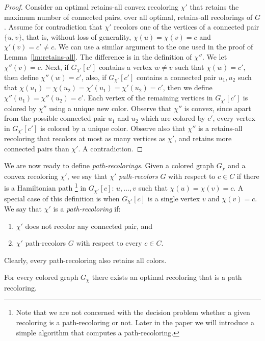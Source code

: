 \begin{proof}
Consider an optimal retains-all convex recoloring $\chi'$ 
that retains the maximum number of connected pairs, 
over all optimal, 
retains-all recolorings of $G$.  
%
Assume for contradiction that $\chi'$ 
recolors one of the vertices of a connected pair $\{u, v\}$, 
that is, 
without loss of generality,
$\chi(u) = \chi(v) = c$ and $\chi'(v) = c' \neq c$.
%
We can use a similar argument to the one used in the proof of Lemma~\ref{lm:retains-all}.
%
The difference is in the definition of $\chi''$.  
%
We let $\chi''(v) = c$. 
Next, if $G_{\chi'}[c']$ contains a vertex $w \neq v$ such that $\chi(w) = c'$,
then define $\chi''(w) = c'$, 
also, if $G_{\chi'}[c']$ contains a connected pair $u_1, u_2$ 
such that $\chi(u_1) = \chi(u_2) = \chi'(u_1) = \chi'(u_2) = c'$, 
then we define $\chi''(u_1) = \chi''(u_2) = c'$.
Each vertex of the remaining vertices in $G_{\chi'}[c']$ is colored by $\chi''$ 
using a unique new color.
%
Observe that $\chi''$ is convex, since apart from the possible
connected pair $u_1$ and $u_2$ which are colored by $c'$, every vertex
in $G_{\chi'}[c']$ is colored by a unique color.
%
Observe also that $\chi''$ is a retains-all recoloring that recolors at most as
many vertices as $\chi'$, and retains more connected pairs than $\chi'$. 
%
A contradiction.
{}\end{proof}

We are now ready to define \emph{path-recolorings}.
%
Given a colored graph $G_\chi$ and a convex recoloring $\chi'$, 
we say that $\chi'$ \emph{path-recolors} $G$ with respect to $c \in C$ 
if there is a Hamiltonian path 
\footnote{
Note that we are not concerned with the decision problem whether a given recoloring 
is a path-recoloring or not.
Later in the paper we will introduce a simple algorithm that computes a path-recoloring. 
} 
in $G_{\chi'}[c]$: 
$u, \dots, v$ such that $\chi(u) = \chi(v) = c$.
%
A special case of this definition is when  $G_{\chi'}[c]$ 
is a single vertex $v$ and $\chi(v) = c$.
%
We say that $\chi'$ is a \emph{path-recoloring} if:
\begin{enumerate}
	\item $\chi'$ does not recolor any connected pair, and 
	\item $\chi'$ path-recolors $G$ with respect to every $c \in C$.
\end{enumerate}
Clearly, every path-recoloring also retains all colors.

\begin{lemma}
\label{lm:optimal_path_recoloring}
For every colored graph $G_\chi$ 
there exists an optimal recoloring that is a path recoloring.
\end{lemma}

